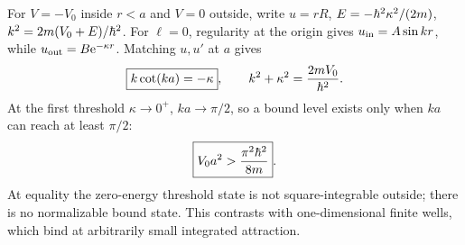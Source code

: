 For $V=-V_0$ inside $r<a$ and $V=0$
outside, write $u=rR$, $E=-\hbar^2\kappa^2/(2m)$,
$k^2=2m(V_0+E)/\hbar^2$. For $\ell=0$,
regularity at the origin gives
$u_{\rm in}=A\sin kr$, while
$u_{\rm out}=B\mathrm e^{-\kappa r}$.
Matching $u,u'$ at $a$ gives
\begin{equation}
\boxed{k\cot(ka)=-\kappa},\qquad
k^2+\kappa^2=\frac{2mV_0}{\hbar^2}.
\end{equation}
At the first threshold $\kappa\to0^+$,
$ka\to\pi/2$, so a bound level exists
only when $ka$ can reach at least $\pi/2$:
\begin{equation}
\boxed{V_0a^2>\frac{\pi^2\hbar^2}{8m}}.
\end{equation}
At equality the zero-energy threshold
state is not square-integrable outside;
there is no normalizable bound state.
This contrasts with one-dimensional
finite wells, which bind at arbitrarily
small integrated attraction.
